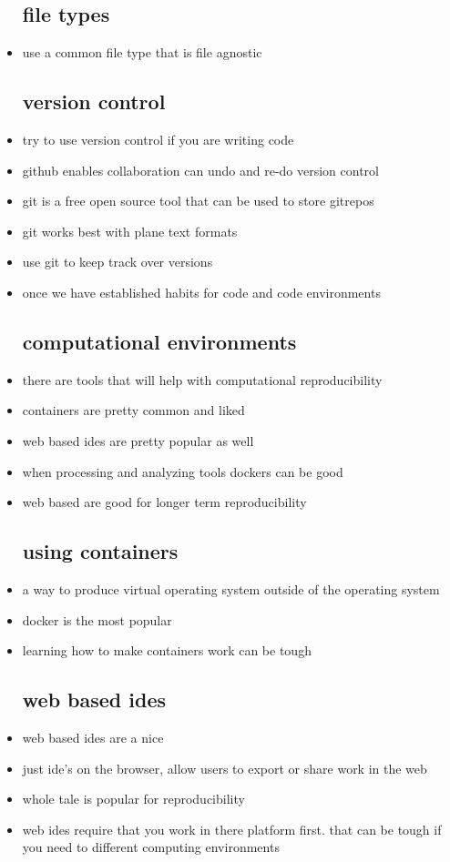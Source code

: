 \documentclass{article}
\begin{document}
\begin{itemize}
\subsection*{file types}
\item use a common file type that is file agnostic 
\subsection*{version control}
\item try to use version control if you are writing code 
\item github enables collaboration can undo and re-do version control 
\item git is a free open source tool that can be used to store gitrepos 
\item git works best with plane text formats 
\item use git to keep track over versions 
\item once we have established habits for code and code environments 
\subsection*{computational environments}
\item there are tools that will help with computational reproducibility
\item containers are pretty common and liked 
\item web based ides are pretty popular as well 
\item when processing and analyzing tools dockers can be good 
\item web based are good for longer term reproducibility
\subsection*{using containers}
\item a way to produce virtual operating system outside of the operating system 
\item docker is the most popular 
\item learning how to make containers work can be tough 
\subsection*{web based ides}
\item web based ides are a nice 
\item just ide's on the browser, allow users to export or share work in the web 
\item whole tale is popular for reproducibility
\item web ides require that you work in there platform first. that can be tough if you need to different computing environments

\end{itemize}
\end{document}
